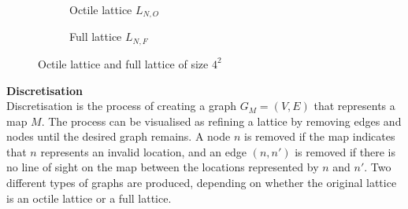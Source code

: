 \documentclass[12pt,notitlepage]{report}
\begin{document}
\begin{figure}[h]
  \begin{subfigure}{.5\textwidth}
    \centering
    \caption[Map]{Octile lattice $L_{N,O}$}
  \end{subfigure}
  \begin{subfigure}{.5\textwidth}
    \centering
    \caption{Full lattice $L_{N,F}$}
  \end{subfigure}
  \caption{Octile lattice and full lattice of size $4^{2}$}
\end{figure}

\noindent
{\bfseries Discretisation}\\
\noindent
Discretisation is the process of creating a graph $G_{M}=(V,E)$ that represents a map $M$. The process can be visualised as refining a lattice by removing edges and nodes until the desired graph remains. A node $n$ is removed if the map indicates that $n$ represents an invalid location, and an edge $(n,n')$ is removed if there is no line of sight on the map between the locations represented by $n$ and $n'$. Two different types of graphs are produced, depending on whether the original lattice is an octile lattice or a full lattice.\\
\end{document}
